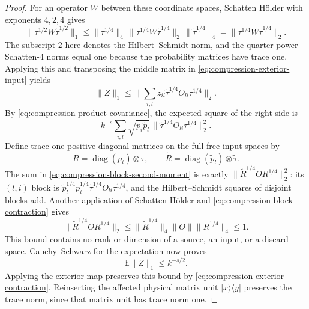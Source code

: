 \documentclass[11pt]{article}
\numberwithin{equation}{section}
\theoremstyle{definition}
\theoremstyle{remark}
\begin{document}
\begin{proof}
For an operator $W$ between these coordinate spaces, Schatten
H\"older with exponents $4,2,4$ gives
\begin{equation}
 \lVert \tau^{1/2}W\widetilde\tau^{1/2}\rVert_1
 \le\lVert \tau^{1/4}\rVert_4\,
       \lVert \tau^{1/4}W\widetilde\tau^{1/4}\rVert_2\,
       \lVert \widetilde\tau^{1/4}\rVert_4
 =\lVert \tau^{1/4}W\widetilde\tau^{1/4}\rVert_2.
 \label{eq:compression-quarter-powers}
\end{equation}
The subscript $2$ here denotes the Hilbert--Schmidt norm, and the
quarter-power Schatten-$4$ norms equal one because the probability
matrices have trace one.  Applying this and transposing the middle
matrix in \eqref{eq:compression-exterior-input} yields
\[
 \lVert Z\rVert_1\le
 \lVert \sum_{i,l}z_{il}
             \widetilde\tau^{1/4}O_{li}\tau^{1/4}\rVert_2.
\]
By \eqref{eq:compression-product-covariance}, the expected square of
the right side is
\begin{equation}
 k^{-s}\sum_{i,l}\sqrt{p_i\widetilde p_l}\,
          \lVert \widetilde\tau^{1/4}O_{li}\tau^{1/4}\rVert_2^2.
 \label{eq:compression-block-second-moment}
\end{equation}
Define trace-one positive diagonal matrices on the full free input
spaces by
\[
 R=\operatorname{diag}(p_i)\otimes\tau,
 \qquad
 \widetilde R=\operatorname{diag}(\widetilde p_l)
                                      \otimes\widetilde\tau.
\]
The sum in \eqref{eq:compression-block-second-moment} is exactly
$\lVert \widetilde R^{1/4}OR^{1/4}\rVert_2^2$: its $(l,i)$ block is
$\widetilde p_l^{1/4}p_i^{1/4}
 \widetilde\tau^{1/4}O_{li}\tau^{1/4}$, and the
Hilbert--Schmidt squares of disjoint blocks add.  Another application
of Schatten H\"older and \eqref{eq:compression-block-contraction} gives
\begin{equation}
 \lVert \widetilde R^{1/4}OR^{1/4}\rVert_2
   \le\lVert \widetilde R^{1/4}\rVert_4\lVert O\rVert\lVert R^{1/4}\rVert_4
   \le1.
 \label{eq:compression-dimension-free}
\end{equation}
This bound contains no rank or dimension of a source, an input, or a
discard space.  Cauchy--Schwarz for the expectation now proves
\begin{equation}
 \mathbb E\lVert Z\rVert_1\le k^{-s/2}.
 \label{eq:compression-one-choice}
\end{equation}
Applying the exterior map preserves this bound by
\eqref{eq:compression-exterior-contraction}.  Reinserting the affected
physical matrix unit $|x\rangle\langle y|$ preserves the trace norm,
since that matrix unit has trace norm one.


\end{proof}
\end{document}
